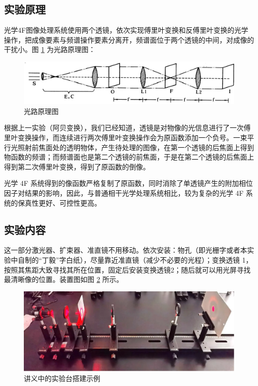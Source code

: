\documentclass[UTF8]{article}
\theoremstyle{MyLineTheoremStyle} %
\theoremstyle{MyBlockTheoremStyle} %
\theoremstyle{MySubsubsectionStyle} %
\begin{document}
\subsection{实验原理}

光学4F图像处理系统使用两个透镜，依次实现傅里叶变换和反傅里叶变换的光学操作，把成像要素与频谱操作要素分离开，频谱面位于两个透镜的中间，对成像的干扰小。图 \ref{光路原理图} 为光路原理图：
\begin{figure}[H]\centering
    \includegraphics[width=0.8\columnwidth]{assets/2 透镜4F/光路原理图.png}
    \caption{光路原理图}\label{光路原理图}
\end{figure}

根据上一实验（阿贝变换），我们已经知道，透镜是对物像的光信息进行了一次傅里叶变换操作，而连续进行两次傅里叶变换操作会为原函数添加一个负号。一束平行光照射前焦面处的透明物体，产生待处理的图像，在第一个透镜的后焦面上得到物函数的频谱；而频谱面也是第二个透镜的前焦面，于是在第二个透镜的后焦面上得到第二次傅里叶变换，得到了原函数的倒像。

光学 4F 系统得到的像函数严格复制了原函数，同时消除了单透镜产生的附加相位因子对结果的影响，因此，与普通相干光学处理系统相比，较为复杂的光学 4F 系统的保真性更好、可控性更高。

\subsection{实验内容}

这一部分激光器、扩束器、准直镜不用移动。依次安装：物孔（即光栅字或者本实验中自制的“丁毅”字白纸），尽量靠近准直镜（减少不必要的光程）；变换透镜 1，按照其焦距大致寻找其所在位置，固定后安装变换透镜2；随后就可以用光屏寻找最清晰像的位置。装置图如图 \ref{4F 讲义中的实验台搭建示例} 所示。

\begin{figure}[H]\centering
    \includegraphics[width=0.80\columnwidth]{assets/2 透镜4F/讲义实验台.png}
    \caption{讲义中的实验台搭建示例}\label{4F 讲义中的实验台搭建示例}
\end{figure}
\end{document}
